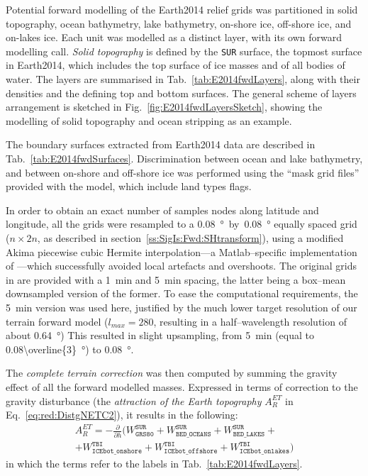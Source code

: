 Potential forward modelling of the {Earth2014} relief grids was partitioned in solid topography, ocean bathymetry, lake bathymetry, on-shore ice, off-shore ice, and on-lakes ice.
Each unit was modelled as a distinct layer, with its own forward modelling call.
\textit{Solid topography} is defined by the \verb|SUR| surface, the topmost surface in {Earth2014}, which includes the top surface of ice masses and of all bodies of water.
The layers are summarised in Tab.~\ref{tab:E2014fwdLayers}, along with their densities and the defining top and bottom surfaces.
The general scheme of layers arrangement is sketched in Fig.~\ref{fig:E2014fwdLayersSketch}, showing the modelling of solid topography and ocean stripping as an example.

The boundary surfaces extracted from {Earth2014} data are described in Tab.~\ref{tab:E2014fwdSurfaces}.
Discrimination between ocean and lake bathymetry, and between on-shore and off-shore ice was performed using the ``mask grid files'' provided with the model, which include land types flags.

In order to obtain an exact number of samples nodes along latitude and longitude, all the grids were resampled to a \SI{0.08}{\degree}~by~\SI{0.08}{\degree} equally spaced grid ($n \times 2n$, as described in section~\ref{ss:SigIs:Fwd:SHtransform}), using a modified Akima piecewise cubic Hermite interpolation---a Matlab--specific implementation of \textcite{Akima1974}---which successfully avoided local artefacts and overshoots.
The original grids in \textcite{Hirt2015} are provided with a \SI{1}{min} and \SI{5}{min} spacing, the latter being a box--mean downsampled version of the former.
To ease the computational requirements, the \SI{5}{min} version was used here, justified by the much lower target resolution of our terrain forward model ($l_{max} = \num{280}$, resulting in a half--wavelength resolution of about \SI{0,64}{\degree})
This resulted in slight upsampling, from \SI{5}{min} (equal to \SI[parse-numbers=false]{0.08\overline{3}}{\degree}) to \SI{0.08}{\degree}.

The \textit{complete terrain correction} was then computed by summing the gravity effect of all the forward modelled masses.
Expressed in terms of correction to the gravity disturbance (the \textit{attraction of the Earth topography} $A_{R}^{ET}$ in Eq.~\ref{eq:red:DistgNETC2}), it results in the following:
\begin{multline}
    \label{eq:CompleteTC}
    A_{R}^{ET} =
    -\frac{\partial}{\partial h}
    (
        W^{\mathtt{SUR}}_{\mathtt{GRS80}} +
        W^{\mathtt{SUR}}_{\mathtt{BED\_OCEANS}} +
        W^{\mathtt{SUR}}_{\mathtt{BED\_LAKES}} + \\
        + W^{\mathtt{TBI}}_{\mathtt{ICEbot\_onshore}} +
        W^{\mathtt{TBI}}_{\mathtt{ICEbot\_offshore}} +
        W^{\mathtt{TBI}}_{\mathtt{ICEbot\_onlakes}}
    )
\end{multline}
in which the terms refer to the labels in Tab.~\ref{tab:E2014fwdLayers}.

